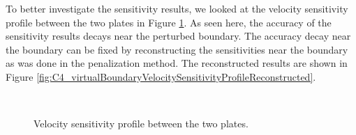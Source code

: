 %
To better investigate the sensitivity results, we looked at the velocity sensitivity profile between the two plates in Figure \ref{fig:C4_virtualBoundaryVelocitySensitivityProfile}. As seen here, the accuracy of the sensitivity results decays near the perturbed boundary. The accuracy decay near the boundary can be fixed by reconstructing the sensitivities near the boundary as was done in the penalization method. The reconstructed results are shown in Figure \ref{fig:C4_virtualBoundaryVelocitySensitivityProfileReconstructed}.
%
\begin{figure}[H]
    \centering
    \quad
    \\
    \quad
    \caption{Velocity sensitivity profile between the two plates.}
    \label{fig:C4_virtualBoundaryVelocitySensitivityProfile}
\end{figure}
